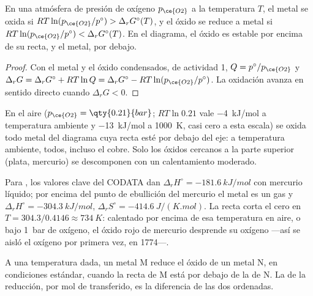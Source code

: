 \begin{theorem}\label{thm:b2:ellingham:domains}
En una atmósfera de presión de oxígeno $p_{\ce{O2}}$ a la temperatura $T$, el
metal se oxida si $RT\ln(p_{\ce{O2}}/p^\circ) > \Delta_r G^\circ(T)$, y el
óxido se reduce a metal si $RT\ln(p_{\ce{O2}}/p^\circ) < \Delta_r
G^\circ(T)$. En el diagrama, el óxido es estable por encima de su recta, y el metal,
por debajo.
\end{theorem}

\begin{proof}
Con el metal y el óxido condensados, de actividad 1, $Q = p^\circ/p_{\ce{O2}}$ y
$\Delta_r G = \Delta_r G^\circ + RT\ln Q = \Delta_r G^\circ - RT\ln(p_{\ce{O2}}/
p^\circ)$. La oxidación avanza en sentido directo cuando $\Delta_r G < 0$.
\end{proof}

En el aire ($p_{\ce{O2}} = \qty{0.21}{bar}$; $RT\ln 0.21$ vale \qty{-4}{kJ/mol}
a temperatura ambiente y \qty{-13}{kJ/mol} a \qty{1000}{K}, casi cero a esta
escala) se oxida todo metal del diagrama cuya recta
esté por debajo del eje: a temperatura ambiente, todos, incluso el cobre.
Solo los óxidos cercanos a la parte superior (plata, mercurio) se descomponen con un
calentamiento moderado.

\begin{example}\label{ex:b2:ellingham:hgo}
Para , los valores clave del CODATA dan $\Delta_r H^\circ =
\qty{-181.6}{kJ/mol}$ con mercurio líquido; por encima del punto de ebullición del mercurio
el metal es un gas y $\Delta_r H^\circ = \qty{-304.3}{kJ/mol}$, $\Delta_r
S^\circ = \qty{-414.6}{J/(K.mol)}$. La recta corta el cero en
$T = 304.3/0.4146 \approx \qty{734}{K}$: calentado por encima de esa temperatura en aire,
o bajo \qty{1}{bar} de oxígeno, el óxido rojo de mercurio desprende su oxígeno
---así se aisló el oxígeno por primera vez, en 1774---.
\end{example}

\begin{proposition}\label{prop:b2:ellingham:reduction}
A una temperatura dada, un metal M reduce el óxido de un metal N, en
condiciones estándar, cuando la recta de M está por debajo de la de N. La  de la reducción, por mol de  transferido, es la
diferencia de las dos ordenadas.
\end{proposition}

